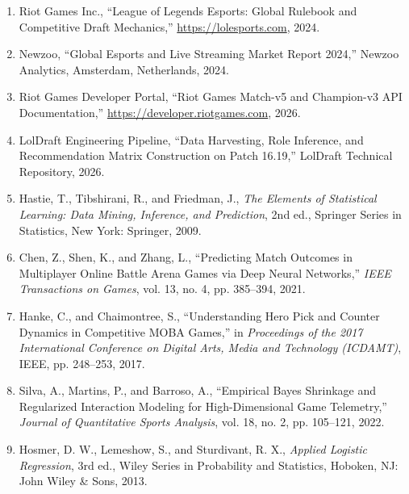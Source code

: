 \documentclass[11pt,letterpaper]{article}
\begin{document}
\begin{enumerate}
\setlength{\itemsep}{1.2em}
\item[{[1]}] Riot Games Inc., ``League of Legends Esports: Global Rulebook and Competitive Draft Mechanics,'' \url{https://lolesports.com}, 2024.

\item[{[2]}] Newzoo, ``Global Esports and Live Streaming Market Report 2024,'' Newzoo Analytics, Amsterdam, Netherlands, 2024.

\item[{[3]}] Riot Games Developer Portal, ``Riot Games Match-v5 and Champion-v3 API Documentation,'' \url{https://developer.riotgames.com}, 2026.

\item[{[4]}] LolDraft Engineering Pipeline, ``Data Harvesting, Role Inference, and Recommendation Matrix Construction on Patch 16.19,'' LolDraft Technical Repository, 2026.

\item[{[5]}] Hastie, T., Tibshirani, R., and Friedman, J., \textit{The Elements of Statistical Learning: Data Mining, Inference, and Prediction}, 2nd ed., Springer Series in Statistics, New York: Springer, 2009.

\item[{[6]}] Chen, Z., Shen, K., and Zhang, L., ``Predicting Match Outcomes in Multiplayer Online Battle Arena Games via Deep Neural Networks,'' \textit{IEEE Transactions on Games}, vol. 13, no. 4, pp. 385--394, 2021.

\item[{[7]}] Hanke, C., and Chaimontree, S., ``Understanding Hero Pick and Counter Dynamics in Competitive MOBA Games,'' in \textit{Proceedings of the 2017 International Conference on Digital Arts, Media and Technology (ICDAMT)}, IEEE, pp. 248--253, 2017.

\item[{[8]}] Silva, A., Martins, P., and Barroso, A., ``Empirical Bayes Shrinkage and Regularized Interaction Modeling for High-Dimensional Game Telemetry,'' \textit{Journal of Quantitative Sports Analysis}, vol. 18, no. 2, pp. 105--121, 2022.

\item[{[9]}] Hosmer, D. W., Lemeshow, S., and Sturdivant, R. X., \textit{Applied Logistic Regression}, 3rd ed., Wiley Series in Probability and Statistics, Hoboken, NJ: John Wiley \& Sons, 2013.
\end{enumerate}
\end{document}
